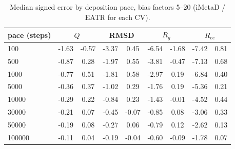\begin{table}[H]\centering
\caption{Median signed error by deposition pace, bias factors 5--20 (iMetaD / EATR for each CV).}\label{tab:s2}
\begin{tabular}{lcccccccc}\toprule
pace (steps) & \multicolumn{2}{c}{$Q$} & \multicolumn{2}{c}{RMSD} & \multicolumn{2}{c}{$R_g$} & \multicolumn{2}{c}{$R_{ee}$}\\ \midrule
100 & -1.63 & -0.57 & -3.37 & 0.45 & -6.54 & -1.68 & -7.42 & 0.81 \\
500 & -0.87 & 0.28 & -1.97 & 0.55 & -3.81 & -0.47 & -7.13 & 0.68 \\
1000 & -0.77 & 0.51 & -1.81 & 0.58 & -2.97 & 0.19 & -6.84 & 0.40 \\
5000 & -0.36 & 0.37 & -1.02 & 0.29 & -1.76 & 0.19 & -5.36 & 0.21 \\
10000 & -0.29 & 0.22 & -0.84 & 0.23 & -1.43 & -0.01 & -4.52 & 0.44 \\
30000 & -0.21 & 0.07 & -0.45 & -0.07 & -0.85 & 0.08 & -3.06 & 0.33 \\
50000 & -0.19 & 0.08 & -0.27 & 0.06 & -0.79 & 0.12 & -2.62 & 0.13 \\
100000 & -0.11 & 0.04 & -0.19 & -0.04 & -0.60 & -0.09 & -1.78 & 0.07\\ \bottomrule
\end{tabular}
\end{table}
